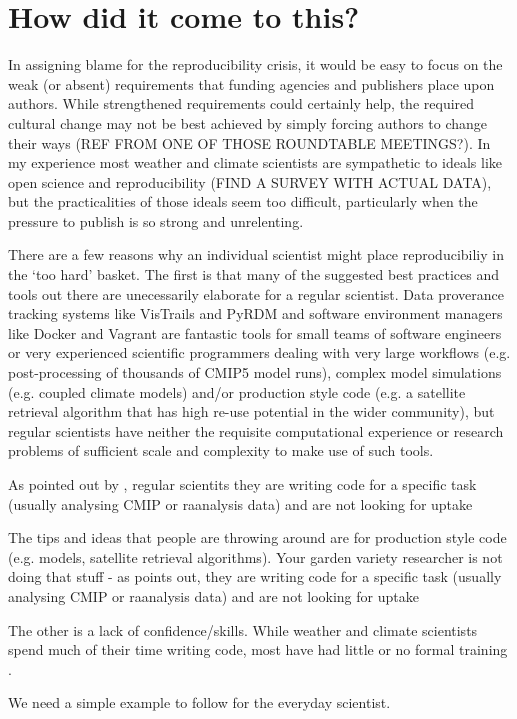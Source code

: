\section{How did it come to this?}

In assigning blame for the reproducibility crisis, it would be easy to focus on the weak (or absent) requirements that funding agencies and publishers place upon authors. While strengthened requirements could certainly help, the required cultural change may not be best achieved by simply forcing authors to change their ways (REF FROM ONE OF THOSE ROUNDTABLE MEETINGS?). In my experience most weather and climate scientists are sympathetic to ideals like open science and reproducibility (FIND A SURVEY WITH ACTUAL DATA), but the practicalities of those ideals seem too difficult, particularly when the pressure to publish is so strong and unrelenting. 

There are a few reasons why an individual scientist might place reproducibiliy in the `too hard' basket. The first is that many of the suggested best practices and tools out there are unecessarily elaborate for a regular scientist. Data proverance tracking systems like VisTrails \citep{Freire2012} and PyRDM and software environment managers like Docker and Vagrant \citep{Stodden2014} are fantastic tools for small teams of software engineers or very experienced scientific programmers dealing with very large workflows (e.g. post-processing of thousands of CMIP5 model runs), complex model simulations (e.g. coupled climate models) and/or production style code (e.g. a satellite retrieval algorithm that has high re-use potential in the wider community), but regular scientists have neither the requisite computational experience or research problems of sufficient scale and complexity to make use of such tools.      

As pointed out by \citet{Easterbrook2014}, regular scientits they are writing code for a specific task (usually analysing CMIP or raanalysis data) and are not looking for uptake 

The tips and ideas that people are throwing around are for production style code (e.g. models, satellite retrieval algorithms). Your garden variety researcher is not doing that stuff - as \citet{Easterbrook2014} points out, they are writing code for a specific task (usually analysing CMIP or raanalysis data) and are not looking for uptake 



The other is a lack of confidence/skills. While weather and climate scientists spend much of their time writing code, most have had little or no formal training \citet{Hannay2009}.   


We need a simple example to follow for the everyday scientist.